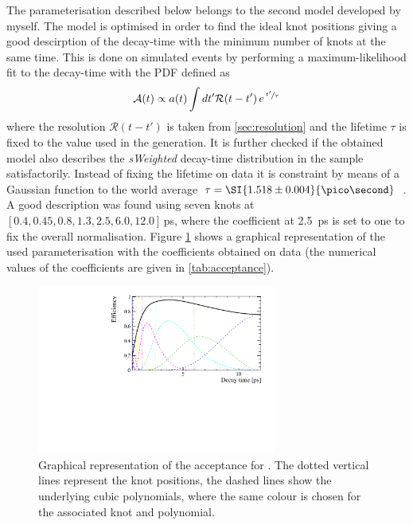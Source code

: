 The parameterisation described below belongs to the second model developed by myself.
The model is optimised in order to find the ideal knot  positions giving a good descirption of the decay-time with the minimum number of knots at the same time.
This is done on simulated events by performing a maximum-likelihood fit to the decay-time with the PDF defined as
\begin{equation}
\mathcal{A}(t)\propto a(t)\int dt' \mathcal{R}\!\left(t-t'\right)e^{\,\nicefrac{t'}{\tau}}
\end{equation}
where the resolution $\mathcal{R}\!\left(t-t'\right)$ is taken from \cref{sec:resolution} and the lifetime $\tau$ is fixed to the value used in the generation.
It is further checked if the obtained model also describes the \emph{sWeighted} decay-time distribution in the \BdToDpi sample satisfactorily.
Instead of fixing the lifetime on data it is constraint by means of a Gaussian function to the world average $\tau=\SI{1.518\pm0.004}{\pico\second}$~\cite{PDG_2017}.
A good description was found using seven knots at $[0.4, 0.45, 0.8, 1.3, 2.5, 6.0, 12.0]\,$\si{\pico\second}, where the coefficient at \SI{2.5}{\pico\second} is set to one to fix the overall normalisation.
Figure \ref{fig:acceptance} shows a graphical representation of the used parameterisation with the coefficients obtained on \BdToDpi data (the numerical values of the coefficients are given in \cref{tab:acceptance}).
\begin{figure}[tbp]
    \centering
    \includegraphics[width=0.7\textwidth]{09TimeFit/figs/Acceptance.pdf}
    \caption{Graphical representation of the acceptance for \BdToDpi.
    The dotted vertical lines represent the knot positions, the dashed lines show the underlying cubic polynomials, where the same colour is chosen for the associated knot and polynomial.}
    \label{fig:acceptance}
\end{figure}
